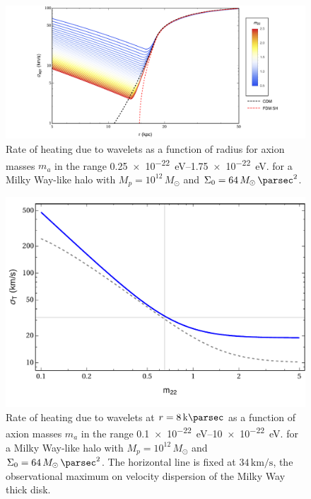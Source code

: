 \documentclass[usenatbib]{mnras}
\begin{document}
\begin{figure}
\includegraphics[width=\columnwidth]{FDM_velocity}
\vspace*{-5mm}
\caption{Rate of heating due to wavelets as a function of radius for axion masses $m_{a}$ in the range \SIrange{0.25 e-22}{ 1.75 e-22}{\electronvolt}. for a Milky Way-like halo with $M_p = 10^{12} \, M_\odot$ and $\Sigma_0 = 64 \, M_\odot \, \si{\per\parsec^2}$.}
\label{fig:radiusheating}
\end{figure}

\begin{figure}
\includegraphics[width=\columnwidth]{FDM_mass_dep}
\vspace*{-5mm}
\caption{Rate of heating due to wavelets at $r = 8\, \si{\kilo \parsec}$ as a function of axion masses $m_{a}$ in the range \SIrange{0.1 e-22}{ 10 e-22}{\electronvolt}. for a Milky Way-like halo with $M_p = 10^{12} \, M_\odot$ and $\Sigma_0 = 64 \, M_\odot \, \si{\per\parsec^2}$. The horizontal line is fixed at $34\, \si{\kilo\meter\per\second}$, the observational maximum on velocity dispersion of the Milky Way thick disk. }
\label{fig:radiusheating}
\end{figure}
\end{document}
